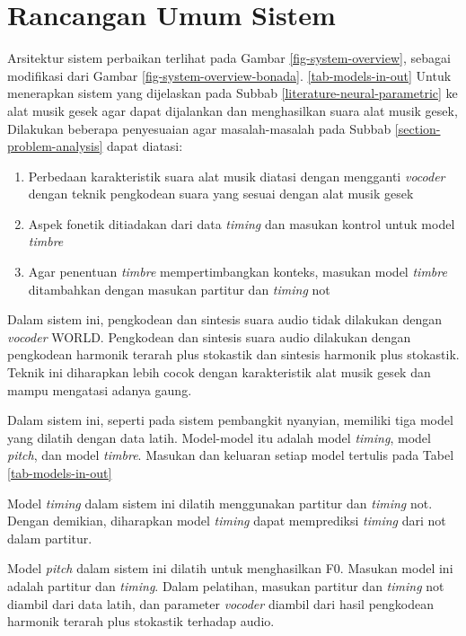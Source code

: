 \section{Rancangan Umum Sistem}

Arsitektur sistem perbaikan terlihat pada Gambar \ref{fig-system-overview}, sebagai modifikasi dari Gambar \ref{fig-system-overview-bonada}. \ref{tab-models-in-out} Untuk menerapkan sistem yang dijelaskan pada Subbab \ref{literature-neural-parametric} ke alat musik gesek agar dapat dijalankan dan menghasilkan suara alat musik gesek, Dilakukan beberapa penyesuaian agar masalah-masalah pada Subbab \ref{section-problem-analysis} dapat diatasi:

\begin{enumerate}

    \item Perbedaan karakteristik suara alat musik diatasi dengan mengganti \textit{vocoder} dengan teknik pengkodean suara yang sesuai dengan alat musik gesek
    \item Aspek fonetik ditiadakan dari data \textit{timing} dan masukan kontrol untuk model \textit{timbre}
    \item Agar penentuan \textit{timbre} mempertimbangkan konteks, masukan model \textit{timbre} ditambahkan dengan masukan partitur dan \textit{timing} not

\end{enumerate}

Dalam sistem ini, pengkodean dan sintesis suara audio tidak dilakukan dengan \textit{vocoder} WORLD. Pengkodean dan sintesis suara audio dilakukan dengan pengkodean harmonik terarah plus stokastik dan sintesis harmonik plus stokastik. Teknik ini diharapkan  lebih cocok dengan karakteristik alat musik gesek dan mampu mengatasi adanya gaung.

Dalam sistem ini, seperti pada sistem pembangkit nyanyian, memiliki tiga model yang dilatih dengan data latih. Model-model itu adalah model \textit{timing}, model \textit{pitch}, dan model \textit{timbre}. Masukan dan keluaran setiap model tertulis pada Tabel \ref{tab-models-in-out}

Model \textit{timing} dalam sistem ini dilatih menggunakan partitur dan \textit{timing} not. Dengan demikian, diharapkan model \textit{timing} dapat memprediksi \textit{timing} dari not dalam partitur.

Model \textit{pitch} dalam sistem ini dilatih untuk menghasilkan F0. Masukan model ini adalah partitur dan \textit{timing}. Dalam pelatihan, masukan partitur dan \textit{timing} not diambil dari data latih, dan parameter \textit{vocoder} diambil dari hasil pengkodean harmonik terarah plus stokastik terhadap audio.

